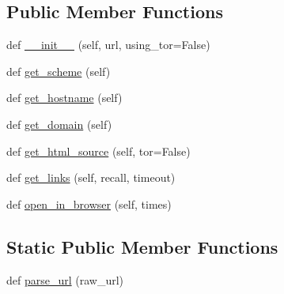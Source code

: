\subsection*{Public Member Functions}
\begin{DoxyCompactItemize}
\item 
def \hyperlink{classhal_1_1internet_1_1web_1_1_webpage_abdd82419586ce1fab58d0d594a4780f8}{\+\_\+\+\_\+init\+\_\+\+\_\+} (self, url, using\+\_\+tor=False)
\item 
def \hyperlink{classhal_1_1internet_1_1web_1_1_webpage_a8a5f45d640b9a433fdd4ab4956141ed0}{get\+\_\+scheme} (self)
\item 
def \hyperlink{classhal_1_1internet_1_1web_1_1_webpage_ad3059e24c2ea962b13944209e086b1c8}{get\+\_\+hostname} (self)
\item 
def \hyperlink{classhal_1_1internet_1_1web_1_1_webpage_a1879c8695e4e1c7c0155d24100fbbbc0}{get\+\_\+domain} (self)
\item 
def \hyperlink{classhal_1_1internet_1_1web_1_1_webpage_ad813eba8e41c06f110311ada3ae86f2c}{get\+\_\+html\+\_\+source} (self, tor=False)
\item 
def \hyperlink{classhal_1_1internet_1_1web_1_1_webpage_a73b639e5eaa4506a653c9a4792f7dead}{get\+\_\+links} (self, recall, timeout)
\item 
def \hyperlink{classhal_1_1internet_1_1web_1_1_webpage_ae3904bbb1924178180ca32e922bbbeb5}{open\+\_\+in\+\_\+browser} (self, times)
\end{DoxyCompactItemize}
\subsection*{Static Public Member Functions}
\begin{DoxyCompactItemize}
\item 
def \hyperlink{classhal_1_1internet_1_1web_1_1_webpage_af6e3dcd4dbebe8e1b196fded24e4025e}{parse\+\_\+url} (raw\+\_\+url)
\end{DoxyCompactItemize}
